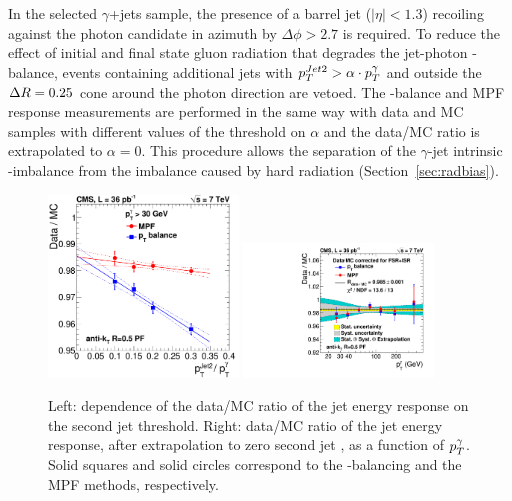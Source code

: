 In the selected $\gamma$+jets sample, the presence of a barrel jet ($|\eta|<1.3$) recoiling against the photon candidate in azimuth by $\Delta \phi > 2.7$ is required. To reduce the effect of initial and final state gluon radiation that degrades the jet-photon \pt-balance, events containing additional jets with $p_{{T}}^{{Jet}2} > \alpha\cdot p_{{T}}^{\gamma}$ and outside the $\Delta R=0.25$ cone around the photon direction are vetoed. The \pt-balance and MPF response measurements are performed in the same way with data and MC samples with different values of the threshold on $\alpha$ and the data/MC ratio is extrapolated to $\alpha=0$. This procedure allows the separation of the $\gamma$-jet intrinsic \pt-imbalance from the imbalance caused by hard radiation (Section~\ref{sec:radbias}). 

\begin{figure}[ht!]
  \begin{center}
    \includegraphics[width=0.45\textwidth]{Figures/JEC/MPF_pTbalance_vspT2nd_AK5}
    \includegraphics[width=0.45\textwidth]{Figures/JEC/FinalDataOverMC3_AK5}
    \caption{Left: dependence of the data/MC ratio of the jet energy response on the second jet \pt threshold. Right: data/MC ratio of the jet energy response, after extrapolation to zero second jet \pt, as a function of $p_{{T}}^\gamma$. Solid squares and solid circles correspond to the \pt-balancing and the MPF methods, respectively.}
    \label{fig:photon}
  \end{center}
\end{figure}

